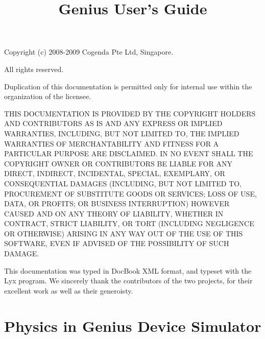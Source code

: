 \documentclass[oneside,12pt]{cgd_book}
\begin{document}
\title{Genius User\textquoteright s Guide}

\maketitle
\clearpage{}

\thispagestyle{empty}

Copyright (c) 2008-2009 Cogenda Pte Ltd, Singapore.

All rights reserved.

Duplication of this documentation is permitted
only for internal use within the organization of the licensee.

THIS DOCUMENTATION IS PROVIDED BY THE COPYRIGHT
HOLDERS AND CONTRIBUTORS \textquotedbl{}AS IS\textquotedbl{} AND ANY
EXPRESS OR IMPLIED WARRANTIES, INCLUDING, BUT NOT LIMITED TO, THE
IMPLIED WARRANTIES OF MERCHANTABILITY AND FITNESS FOR A PARTICULAR
PURPOSE ARE DISCLAIMED. IN NO EVENT SHALL THE COPYRIGHT OWNER OR CONTRIBUTORS
BE LIABLE FOR ANY DIRECT, INDIRECT, INCIDENTAL, SPECIAL, EXEMPLARY,
OR CONSEQUENTIAL DAMAGES (INCLUDING, BUT NOT LIMITED TO, PROCUREMENT
OF SUBSTITUTE GOODS OR SERVICES; LOSS OF USE, DATA, OR PROFITS; OR
BUSINESS INTERRUPTION) HOWEVER CAUSED AND ON ANY THEORY OF LIABILITY,
WHETHER IN CONTRACT, STRICT LIABILITY, OR TORT (INCLUDING NEGLIGENCE
OR OTHERWISE) ARISING IN ANY WAY OUT OF THE USE OF THIS SOFTWARE,
EVEN IF ADVISED OF THE POSSIBILITY OF SUCH DAMAGE.

\vfill{}


This documentation was typed in DocBook XML format, and typeset with
the Lyx program. We sincerely thank the contributors of the two projects,
for their excellent work as well as their generoisty.

\newpage{}

\tableofcontents{}


\chapter{Physics in Genius Device Simulator}
\end{document}

